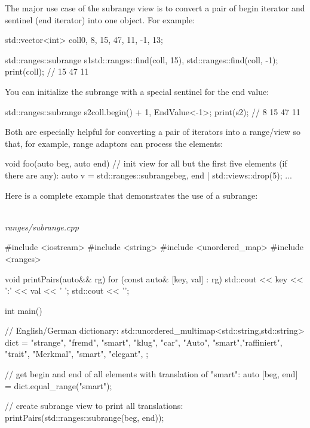 The major use case of the subrange view is to convert a pair of begin iterator and sentinel (end iterator) into one object. For example:

\begin{cpp}
std::vector<int> coll{0, 8, 15, 47, 11, -1, 13};

std::ranges::subrange s1{std::ranges::find(coll, 15),
						std::ranges::find(coll, -1)};
print(coll); // 15 47 11
\end{cpp}

You can initialize the subrange with a special sentinel for the end value:

\begin{cpp}
std::ranges::subrange s2{coll.begin() + 1, EndValue<-1>{}};
print(s2); // 8 15 47 11
\end{cpp}

Both are especially helpful for converting a pair of iterators into a range/view so that, for example, range adaptors can process the elements:

\begin{cpp}
void foo(auto beg, auto end)
{
	// init view for all but the first five elements (if there are any):
	auto v = std::ranges::subrange{beg, end} | std::views::drop(5);
	...
}
\end{cpp}

Here is a complete example that demonstrates the use of a subrange:

\noindent
\hspace*{\fill} \\ %
\textit{ranges/subrange.cpp}

\begin{cpp}
#include <iostream>
#include <string>
#include <unordered_map>
#include <ranges>

void printPairs(auto&& rg)
{
	for (const auto& [key, val] : rg) {
		std::cout << key << ':' << val << ' ';
	}
	std::cout << '\n';
}

int main()
{
	// English/German dictionary:
	std::unordered_multimap<std::string,std::string> dict = {
		{"strange", "fremd"},
		{"smart", "klug"},
		{"car", "Auto"},
		{"smart","raffiniert"},
		{"trait", "Merkmal"},
		{"smart", "elegant"},
	};
	
	// get begin and end of all elements with translation of "smart":
	auto [beg, end] = dict.equal_range("smart");
	
	// create subrange view to print all translations:
	printPairs(std::ranges::subrange(beg, end));
}
\end{cpp}

